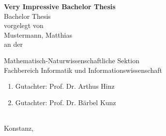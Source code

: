
\newcommand{\MyTitle}{Very Impressive Bachelor Thesis}
\newcommand{\MyThesisType}{Bachelor Thesis}
\newcommand{\MyAuthor}{Mustermann, Matthias}

\newcommand{\MySektion}{Mathematisch-Naturwissenschaftliche Sektion}
\newcommand{\MyDepartement}{Fachbereich Informatik und Informationswissenschaft}

\newcommand{\MyCorrectorType}{Gutachter}
\newcommand{\MyCorrectorA}{Prof. Dr. Arthus Hinz}
\newcommand{\MyCorrectorB}{Prof. Dr. B\"arbel Kunz}

\begin{titlepage}
\pagestyle{empty}
\begin{center}

{\Huge \textbf{\MyTitle}} \\[2cm]

{\Large \MyThesisType} \\[1cm]

{\Large vorgelegt von \\[.3cm]
\MyAuthor} \\[1cm]

{\Large an der}


{\Large \MySektion}\\[1cm]

{\Large \MyDepartement}\\[1cm]

{\Large
\begin{enumerate}
    \item \MyCorrectorType: \MyCorrectorA
    \item \MyCorrectorType: \MyCorrectorB
\end{enumerate}
} \ \\[1cm]

{\Large Konstanz, \the\year}

\end{center}

\cleardoublepage

\pagestyle{plain}
\setcounter{page}{1}
\end{titlepage}
